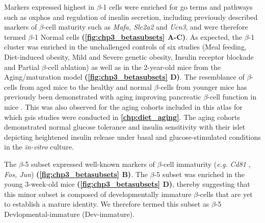 \par Markers expressed highest in $\beta$-1 cells were enriched for \gls{go} terms and pathways such as \gls{oxphos} and regulation of insulin secretion, including previously described markers of $\beta$-cell maturity such as \textit{Mafa, Slc2a2}  and \textit{Ucn3}, and were therefore termed $\beta$-1 Normal cells \textbf{(\autoref{fig:chp3_betasubsets} A-C)}. As expected, the $\beta$-1 cluster was enriched in the unchallenged controls of six studies (Meal feeding, Diet-induced obesity, Mild and Severe genetic obesity, Insulin receptor blockade and Partial $\beta$-cell ablation) as well as in the 2-year-old mice from the Aging/maturation model \textbf{(\autoref{fig:chp3_betasubsets} D)}. The resemblance of $\beta$-cells from aged mice to the healthy and normal $\beta$-cells from younger mice has previously been demonstrated with aging improving pancreatic $\beta$-cell function in mice \textbf{\cite{xin_single-cell_2016}}. This was also observed for the aging cohorts included in this atlas for which \gls{gsis} studies were conducted in \textbf{\autoref{chp:diet_aging}}. The aging cohorts demonstrated normal glucose tolerance and insulin sensitivity with their islet depicting heightened insulin release under basal and glucose-stimulated conditions in the \textit{in-vitro} culture.\\

\par The $\beta$-5 subset expressed well-known markers of $\beta$-cell immaturity (\textit{e.g.} \textit{Cd81} \textbf{\cite{salinno_cd81_2021}}, \textit{Fos, Jun}) \textbf{(\autoref{fig:chp3_betasubsets} B)}. The $\beta$-5 subset was enriched in the young 3-week-old mice \textbf{(\autoref{fig:chp3_betasubsets} D)}, thereby suggesting that this minor subset is composed of developmentally immature $\beta$-cells that are yet to establish a mature identity. We therefore termed this subset as $\beta$-5 Devlopmental-immature (Dev-immature).\\

